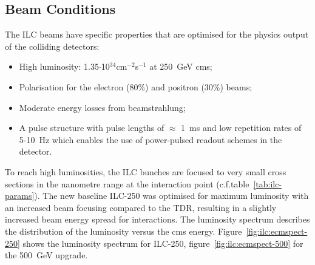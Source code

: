 \subsection{Beam Conditions}
The ILC beams have specific properties that are optimised for the physics output of the colliding detectors:
\begin{itemize}
\item High luminosity: 1.35$\cdot$10$^{34}$cm$^{-2}$s$^{-1}$ at 250~GeV cms;
\item Polarisation for the electron (80\%) and positron (30\%) beams;
\item Moderate energy losses from beamstrahlung;
\item A pulse structure with pulse lengths of $\approx$ 1~ms and low repetition rates of 5-10~Hz which enables the use of power-pulsed readout schemes in the detector.
\end{itemize}
To reach high luminosities, the ILC bunches are focused to very small cross sections in the nanometre range at the interaction point (c.f.table~\ref{tab:ilc-params}). The new baseline ILC-250 was optimised for maximum luminosity with an increased beam focusing compared to the TDR, resulting in a slightly increased beam energy spread for interactions. The luminosity spectrum describes the distribution of the luminosity versus the cms energy. Figure~\ref{fig:ilc:ecmspect-250} shows the luminosity spectrum for ILC-250, figure~\ref{fig:ilc:ecmspect-500} for the 500~GeV upgrade.

